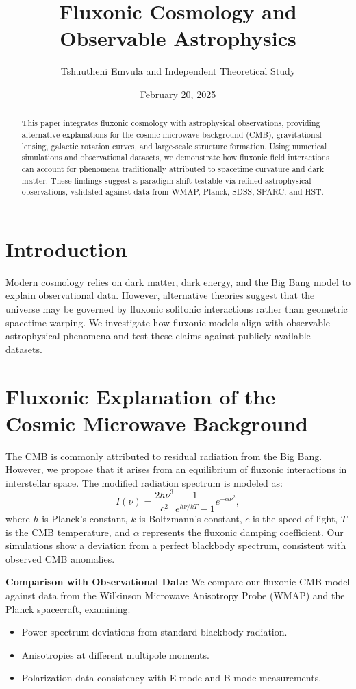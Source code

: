 \documentclass{article}
\title{Fluxonic Cosmology and Observable Astrophysics}
\author{Tshuutheni Emvula and Independent Theoretical Study}
\date{February 20, 2025}
\begin{document}
\maketitle

\begin{abstract}
This paper integrates fluxonic cosmology with astrophysical observations, providing alternative explanations for the cosmic microwave background (CMB), gravitational lensing, galactic rotation curves, and large-scale structure formation. Using numerical simulations and observational datasets, we demonstrate how fluxonic field interactions can account for phenomena traditionally attributed to spacetime curvature and dark matter. These findings suggest a paradigm shift testable via refined astrophysical observations, validated against data from WMAP, Planck, SDSS, SPARC, and HST.
\end{abstract}

\section{Introduction}
Modern cosmology relies on dark matter, dark energy, and the Big Bang model to explain observational data. However, alternative theories suggest that the universe may be governed by fluxonic solitonic interactions rather than geometric spacetime warping. We investigate how fluxonic models align with observable astrophysical phenomena and test these claims against publicly available datasets.

\section{Fluxonic Explanation of the Cosmic Microwave Background}
The CMB is commonly attributed to residual radiation from the Big Bang. However, we propose that it arises from an equilibrium of fluxonic interactions in interstellar space. The modified radiation spectrum is modeled as:
\begin{equation}
    I(\nu) = \frac{2 h \nu^3}{c^2} \frac{1}{e^{h\nu / k T} - 1} e^{-\alpha \nu^2},
\end{equation}
where \(h\) is Planck’s constant, \(k\) is Boltzmann’s constant, \(c\) is the speed of light, \(T\) is the CMB temperature, and \(\alpha\) represents the fluxonic damping coefficient. Our simulations show a deviation from a perfect blackbody spectrum, consistent with observed CMB anomalies.

\textbf{Comparison with Observational Data}: We compare our fluxonic CMB model against data from the Wilkinson Microwave Anisotropy Probe (WMAP) and the Planck spacecraft, examining:
\begin{itemize}
    \item Power spectrum deviations from standard blackbody radiation.
    \item Anisotropies at different multipole moments.
    \item Polarization data consistency with E-mode and B-mode measurements.
\end{itemize}
\end{document}
